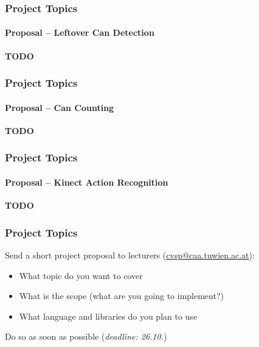 \documentclass[xetex]{beamer}
\begin{document}
\begin{frame}
\frametitle{Project Topics}
\framesubtitle{Proposal -- Leftover Can Detection}

\begin{center}
	\textbf{TODO}
\end{center}

\end{frame}


\begin{frame}
\frametitle{Project Topics}
\framesubtitle{Proposal -- Can Counting}

\begin{center}
	\textbf{TODO}
\end{center}

\end{frame}


\begin{frame}
\frametitle{Project Topics}
\framesubtitle{Proposal -- Kinect Action Recognition}

\begin{center}
	\textbf{TODO}
\end{center}

\end{frame}


\begin{frame}
\frametitle{Project Topics}

Send a short project proposal to lecturers (\url{cvsp@caa.tuwien.ac.at}):
\begin{itemize}
	\item What topic do you want to cover
	\item What is the scope (what are you going to implement?)
	\item What language and libraries do you plan to use
\end{itemize}

\bigskip
Do so as soon as possible (\emph{deadline: 26.10.})

\end{frame}

\end{document}
